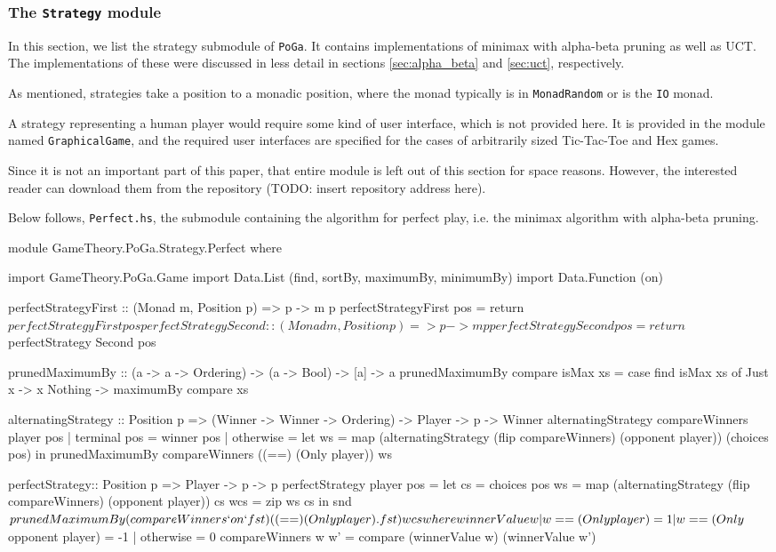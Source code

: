\subsubsection {The \texttt{Strategy} module}

In this section, we list the strategy submodule of \texttt{PoGa}.
It contains implementations of minimax with alpha-beta pruning as well as UCT.
The implementations of these were discussed in less detail in sections \ref{sec:alpha_beta} and \ref{sec:uct}, respectively.

As mentioned, strategies take a position to a monadic position, where the monad typically is in \texttt{MonadRandom} or is the \texttt{IO} monad.

A strategy representing a human player would require some kind of user interface, which is not provided here.
It is provided in the module named \texttt{GraphicalGame}, and the required user interfaces are specified for the cases of arbitrarily sized Tic-Tac-Toe and Hex games.

Since it is not an important part of this paper, that entire module is left out of this section for space reasons.
However, the interested reader can download them from the repository (TODO: insert repository address here).

Below follows, \texttt{Perfect.hs}, the submodule containing the algorithm for perfect play, i.e. the minimax algorithm with alpha-beta pruning.

\begin{code}
module GameTheory.PoGa.Strategy.Perfect where

import GameTheory.PoGa.Game
import Data.List (find, sortBy, maximumBy, minimumBy)
import Data.Function (on)

perfectStrategyFirst :: (Monad m, Position p) => p -> m p
perfectStrategyFirst pos = return $ perfectStrategy First pos
perfectStrategySecond :: (Monad m, Position p) => p -> m p
perfectStrategySecond pos = return $ perfectStrategy Second pos

prunedMaximumBy :: (a -> a -> Ordering) -> (a -> Bool) -> [a] -> a
prunedMaximumBy compare isMax xs = 
  case find isMax xs of
    Just x -> x
    Nothing -> maximumBy compare xs

alternatingStrategy :: Position p =>
                       (Winner -> Winner -> Ordering) ->
                       Player -> p -> Winner
alternatingStrategy compareWinners player pos
  | terminal pos = winner pos
  | otherwise =
      let ws = map (alternatingStrategy
                    (flip compareWinners)
                    (opponent player)) (choices pos) in
      prunedMaximumBy compareWinners ((==) (Only player)) ws
    
perfectStrategy:: Position p => Player -> p -> p
perfectStrategy player pos = 
  let cs = choices pos
      ws = map (alternatingStrategy
                (flip compareWinners)
                (opponent player)) cs
      wcs = zip ws cs in
  snd $ prunedMaximumBy (compareWinners `on` fst) ((==) (Only player) . fst) wcs
  where
    winnerValue w
      | w == (Only player) = 1 
      | w == (Only $ opponent player) = -1 
      | otherwise = 0
    compareWinners w w' = compare (winnerValue w) (winnerValue w')
\end{code}

